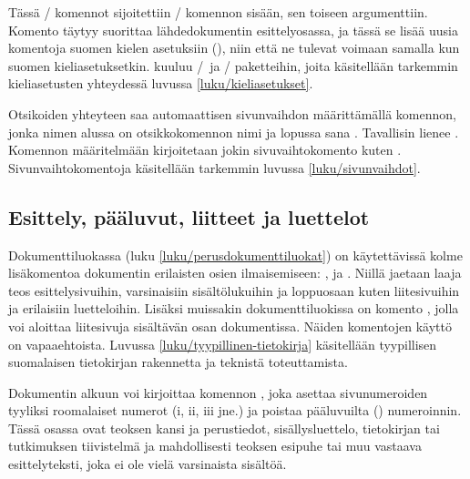 \begin{koodilohkosis}
\addto{\captionsfinnish}{
  \renewcommand{\partname}{Kausi}
  \renewcommand{\chaptername}{Päivä}
}
\end{koodilohkosis}

\noindent
Tässä \-/ komennot sijoitettiin \-/
komennon sisään, sen toiseen argumenttiin. Komento 
täytyy suorittaa lähdedokumentin esittelyosassa, ja tässä se lisää uusia
komentoja suomen kielen asetuksiin (), niin
että ne tulevat voimaan samalla kun suomen kieliasetuksetkin.
 kuuluu \-/\ ja \-/
paketteihin, joita käsitellään tarkemmin kieliasetusten yhteydessä
luvussa \ref{luku/kieliasetukset}.

Otsikoiden yhteyteen saa automaattisen sivunvaihdon määrittämällä
komennon, jonka nimen alussa on otsikkokomennon nimi ja lopussa sana
. Tavallisin lienee . Komennon
määritelmään kirjoitetaan jokin sivuvaihtokomento kuten
. Sivunvaihtokomentoja käsitellään tarkemmin luvussa
\ref{luku/sivunvaihdot}.

\begin{koodilohkosis}
\newcommand{\sectionbreak}{\clearpage}
\end{koodilohkosis}

\subsection{Esittely, pääluvut, liitteet ja luettelot}
\label{luku/frontmainbackmatter}

Dokumenttiluokassa  (luku \ref{luku/perusdokumenttiluokat})
on käytettävissä kolme lisäkomentoa dokumentin erilaisten osien
ilmaisemiseen: ,  ja
. Niillä jaetaan laaja teos esittelysivuihin,
varsinaisiin sisältölukuihin ja loppuosaan kuten liitesivuihin ja
erilaisiin luetteloihin. Lisäksi muissakin dokumenttiluokissa on komento
, jolla voi aloittaa liitesivuja sisältävän osan
dokumentissa. Näiden komentojen käyttö on vapaaehtoista. Luvussa
\ref{luku/tyypillinen-tietokirja} käsitellään tyypillisen suomalaisen
tietokirjan rakennetta ja teknistä toteuttamista.

Dokumentin alkuun voi kirjoittaa komennon , joka
asettaa sivunumeroiden tyyliksi roomalaiset numerot (i, ii, iii jne.) ja
poistaa pääluvuilta () numeroinnin. Tässä osassa ovat
teoksen kansi ja perustiedot, sisällysluettelo, tietokirjan tai
tutkimuksen tiivistelmä ja mahdollisesti teoksen esipuhe tai muu
vastaava esittelyteksti, joka ei ole vielä varsinaista sisältöä.

